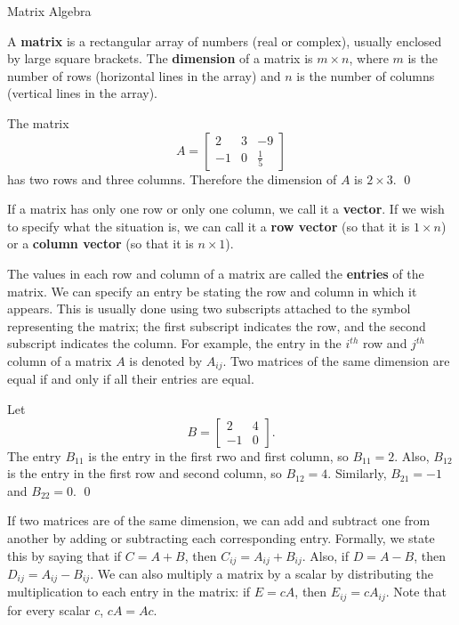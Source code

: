 \documentclass[12pt,letterpaper,twoside]{amsart}
\newcounter{example}
\newcounter{exercise}
\newcommand{\example}{\bigskip \noindent {\large {\sc Example \arabic{example}:}} \addtocounter{example}{1}}
\begin{document}
\begin{center} {\LARGE Matrix Algebra} \end{center}

\setcounter{example}{1}
\setcounter{exercise}{1}

A {\bf matrix} is a rectangular array of numbers (real or complex), usually enclosed by large square brackets.  The {\bf dimension} of a matrix is $m \times n$, where $m$ is the number of rows (horizontal lines in the array) and $n$ is the number of columns (vertical lines in the array).

\example The matrix
\[ A = \left[ \begin{matrix} 2 & 3 & -9 \\ -1 & 0 & \frac{1}{5} \end{matrix} \right] \]
has two rows and three columns.  Therefore the dimension of $A$ is $2 \times 3$.
\qed

If a matrix has only one row or only one column, we call it a {\bf vector}.  If we wish to specify what the situation is, we can call it a {\bf row vector} (so that it is $1 \times n$) or a {\bf column vector} (so that it is $n \times 1$).

The values in each row and column of a matrix are called the {\bf entries} of the matrix.  We can specify an entry be stating the row and column in which it appears.  This is usually done using two subscripts attached to the symbol representing the matrix; the first subscript indicates the row, and the second subscript indicates the column.  For example, the entry in the $i^{th}$ row and $j^{th}$ column of a matrix $A$ is denoted by $A_{ij}$.  Two matrices of the same dimension are equal if and only if all their entries are equal.

\example Let 
\[ B = \left[ \begin{matrix} 2 & 4 \\ -1 & 0 \end{matrix} \right]. \]
The entry $B_{11}$ is the entry in the first rwo and first column, so $B_{11}=2$.  Also, $B_{12}$ is the entry in the first row and second column, so $B_{12}=4$.  Similarly, $B_{21}=-1$ and $B_{22}=0$.
\qed

If two matrices are of the same dimension, we can add and subtract one from another by adding or subtracting each corresponding entry.  Formally, we state this by saying that if $C=A+B$, then $C_{ij}=A_{ij}+B_{ij}$.  Also, if $D=A-B$, then $D_{ij}=A_{ij}-B_{ij}$.  We can also multiply a matrix by a scalar by distributing the multiplication to each entry in the matrix: if $E=cA$, then $E_{ij}=cA_{ij}$.  Note that for every scalar $c$, $cA=Ac$.
\end{document}

